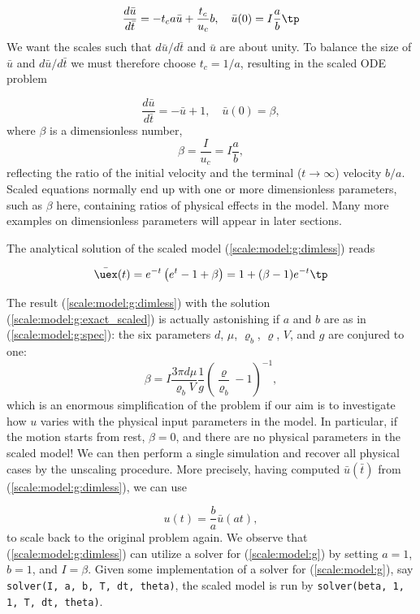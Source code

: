 \documentclass[graybox,envcountchap,sectrefs,final]{svmonodo}
\begin{document}
\[
\frac{d\bar u}{d\bar t} = -t_c a\bar u + \frac{t_c}{u_c}b,
\quad \bar u(0) = I\frac{a}{b}
\tp
\]
We want the scales such that $d\bar u/d\bar t$ and $\bar u$ are
about unity.
To balance the size of $\bar u$ and $d\bar u/d\bar t$ we must
therefore choose
$t_c = 1/a$, resulting in the scaled ODE problem

\begin{equation}
\frac{d\bar u}{d\bar t} = -\bar u + 1,\quad \bar u(0)=\beta,
\label{scale:model:g:dimless}
\end{equation}
where $\beta$ is a dimensionless number,
\begin{equation}
\beta = \frac{I}{u_c} = I\frac{a}{b},
\end{equation}
reflecting the ratio of the initial velocity and the
terminal ($t\rightarrow \infty$) velocity $b/a$.
Scaled equations normally end up with one or more dimensionless parameters,
such as $\beta$ here, containing ratios of physical effects in
the model. Many more examples on dimensionless parameters will appear
in later sections.

The analytical solution of the scaled model
(\ref{scale:model:g:dimless}) reads

\begin{equation}
\bar\uex(t) =
e^{-t}\left( e^{t}-1 + \beta\right) = 1 + (\beta -1)e^{-t}\tp
\label{scale:model:g:exact_scaled}
\end{equation}

The result (\ref{scale:model:g:dimless}) with the
solution (\ref{scale:model:g:exact_scaled}) is actually
astonishing if $a$ and $b$ are as in (\ref{scale:model:g:spec}):
the six parameters $d$, $\mu$, $\varrho_b$, $\varrho$, $V$, and $g$
are conjured to one:
\[ \beta = I\frac{3\pi d\mu}{\varrho_b V}
\frac{1}{g}\left(\frac{\varrho}{\varrho_b} -1\right)^{-1},
\]
which is an enormous simplification of the problem if our aim is to
investigate how $u$ varies with the physical input parameters in
the model.
In particular, if the motion starts from rest, $\beta=0$, and
there are no physical parameters in the scaled model!
We can then perform a single simulation and recover all physical
cases by the unscaling procedure. More precisely,
having computed $\bar u(\bar t)$ from (\ref{scale:model:g:dimless}),
we can use

\begin{equation}
u(t) = \frac{b}{a}\bar u(at),
\end{equation}
to scale back to the original
problem again.
We observe that (\ref{scale:model:g:dimless}) can utilize a solver
for (\ref{scale:model:g}) by setting $a=1$, $b=1$, and $I=\beta$.
Given some implementation of a solver for (\ref{scale:model:g}),
say \texttt{solver(I, a, b, T, dt, theta)},
the scaled model is run by \texttt{solver(beta, 1, 1, T, dt, theta)}.
\end{document}
